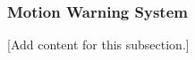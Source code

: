 
\subsubsection{Motion Warning System}
\label{subsubsec:design_4_4_motion_warning_system}

[Add content for this subsection.]
